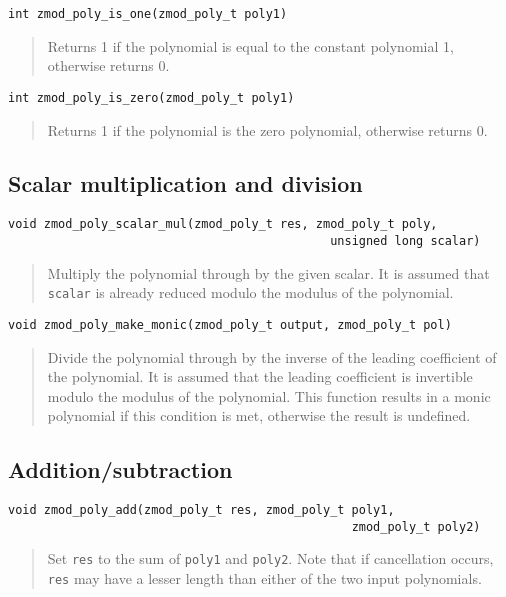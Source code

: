 \documentclass[a4paper,10pt]{article}
\newcommand{\code}{\lstinline}
\begin{document}
\begin{lstlisting}
int zmod_poly_is_one(zmod_poly_t poly1)
\end{lstlisting}
\begin{quote}
Returns 1 if the polynomial is equal to the constant polynomial 1, otherwise returns 0.
\end{quote}

\begin{lstlisting}
int zmod_poly_is_zero(zmod_poly_t poly1)
\end{lstlisting}
\begin{quote}
Returns 1 if the polynomial is the zero polynomial, otherwise returns 0. 
\end{quote}

\subsection{Scalar multiplication and division}
\begin{lstlisting}
void zmod_poly_scalar_mul(zmod_poly_t res, zmod_poly_t poly, 
                                             unsigned long scalar)
\end{lstlisting}
\begin{quote}
Multiply the polynomial through by the given scalar. It is assumed that \code{scalar} is already reduced modulo the modulus of the polynomial.
\end{quote}

\begin{lstlisting}
void zmod_poly_make_monic(zmod_poly_t output, zmod_poly_t pol)
\end{lstlisting}
\begin{quote}
Divide the polynomial through by the inverse of the leading coefficient of the polynomial. It is assumed that the leading coefficient is invertible modulo the modulus of the polynomial. This function results in a monic polynomial if this condition is met, otherwise the result is undefined.
\end{quote}

\subsection{Addition/subtraction}
\begin{lstlisting}
void zmod_poly_add(zmod_poly_t res, zmod_poly_t poly1, 
                                                zmod_poly_t poly2)
\end{lstlisting}
\begin{quote}
Set \code{res} to the sum of \code{poly1} and \code{poly2}. Note that if cancellation occurs, \code{res} may have a lesser length than either of the two input polynomials.
\end{quote}
\end{document}
